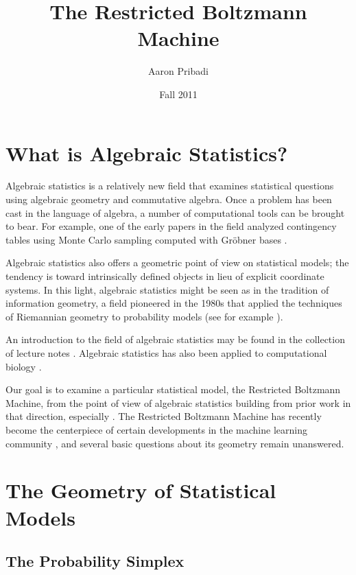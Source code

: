 \documentclass[11pt,titlepage]{article}
\title{The Restricted Boltzmann Machine}
\author{Aaron Pribadi}
\date{Fall 2011}
\numberwithin{equation}{section}
\begin{document}
\maketitle

\tableofcontents

\pagebreak

\section{What is Algebraic Statistics?}

    Algebraic statistics is a relatively new field that examines statistical
    questions using algebraic geometry and commutative algebra.  Once a problem
    has been cast in the language of algebra, a number of computational tools
    can be brought to bear.  For example, one of the early papers in the field
    analyzed contingency tables using Monte Carlo sampling computed with Gröbner
    bases \cite{DS98}.

    Algebraic statistics also offers a geometric point of view on statistical
    models; the tendency is toward intrinsically defined objects in lieu of
    explicit coordinate systems.  In this light, algebraic statistics might be
    seen as in the tradition of information geometry, a field pioneered in the
    1980s that applied the techniques of Riemannian geometry to probability
    models (see for example \cite{Ama}).

    An introduction to the field of algebraic statistics may be found in the
    collection of lecture notes \cite{DSS08}.  Algebraic statistics has also
    been applied to computational biology \cite{ASCB}.

    Our goal is to examine a particular statistical model, the Restricted
    Boltzmann Machine, from the point of view of algebraic statistics building
    from prior work in that direction, especially \cite{CMS09}.  The Restricted
    Boltzmann Machine has recently become the centerpiece of certain
    developments in the machine learning community \cite{Hin07}, and several
    basic questions about its geometry remain unanswered.

\section{The Geometry of Statistical Models}
    \subsection{The Probability Simplex}
\end{document}
